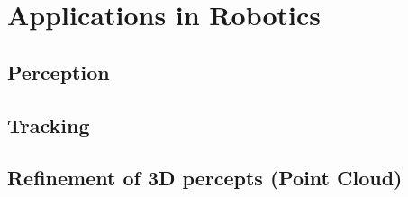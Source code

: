 
\chapter{Applications in Robotics}
\label{chapter:app}

\section{Perception}
\label{sec:per}

\section{Tracking}
\label{sec:track}

\section{Refinement of 3D percepts (Point Cloud)}
\label{sec:refinement}

